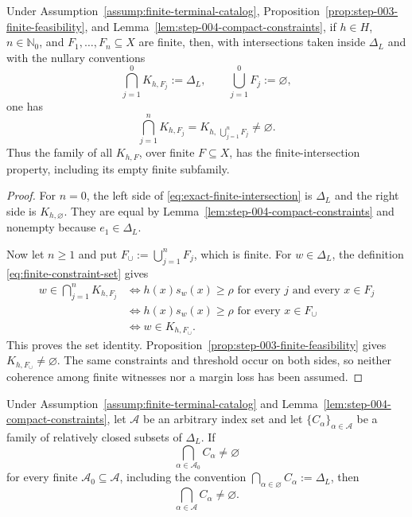 \begin{proposition}
\label{prop:step-004-exact-fip}
Under Assumption~\ref{assump:finite-terminal-catalog},
Proposition~\ref{prop:step-003-finite-feasibility}, and
Lemma~\ref{lem:step-004-compact-constraints}, if $h\in H$,
$n\in\mathbb N_0$, and $F_1,\ldots,F_n\subseteq X$ are finite, then,
with intersections taken inside $\Delta_L$ and with the nullary conventions
\[
\bigcap_{j=1}^0K_{h,F_j}:=\Delta_L,
\qquad
\bigcup_{j=1}^0F_j:=\varnothing,
\]
one has
\begin{equation}\label{eq:exact-finite-intersection}
\bigcap_{j=1}^nK_{h,F_j}
=K_{h,\,\bigcup_{j=1}^nF_j}\ne\varnothing.
\end{equation}
Thus the family of all $K_{h,F}$, over finite $F\subseteq X$, has the
finite-intersection property, including its empty finite subfamily.
\end{proposition}

\begin{proof}
For $n=0$, the left side of \eqref{eq:exact-finite-intersection} is
$\Delta_L$ and the right side is $K_{h,\varnothing}$.  They are equal by
Lemma~\ref{lem:step-004-compact-constraints} and nonempty because
$e_1\in\Delta_L$.

Now let $n\ge1$ and put $F_\cup:=\bigcup_{j=1}^nF_j$, which is finite.
For $w\in\Delta_L$, the definition \eqref{eq:finite-constraint-set} gives
\begin{align*}
w\in\bigcap_{j=1}^nK_{h,F_j}
&\iff
\text{$h(x)s_w(x)\ge\rho$ for every $j$ and every $x\in F_j$}\\
&\iff
\text{$h(x)s_w(x)\ge\rho$ for every $x\in F_\cup$}\\
&\iff w\in K_{h,F_\cup}.
\end{align*}
This proves the set identity.  Proposition~\ref{prop:step-003-finite-feasibility}
gives $K_{h,F_\cup}\ne\varnothing$.  The same constraints and threshold
occur on both sides, so neither coherence among finite witnesses nor a margin
loss has been assumed.
\end{proof}

\begin{lemma}
\label{lem:step-004-compact-fip}
Under Assumption~\ref{assump:finite-terminal-catalog} and
Lemma~\ref{lem:step-004-compact-constraints}, let $\mathcal A$ be an
arbitrary index set and let $\{C_\alpha\}_{\alpha\in\mathcal A}$ be a family
of relatively closed subsets of $\Delta_L$.  If
\[
\bigcap_{\alpha\in\mathcal A_0}C_\alpha\ne\varnothing
\]
for every finite $\mathcal A_0\subseteq\mathcal A$, including the convention
$\bigcap_{\alpha\in\varnothing}C_\alpha:=\Delta_L$, then
\[
\bigcap_{\alpha\in\mathcal A}C_\alpha\ne\varnothing.
\]
\end{lemma}

